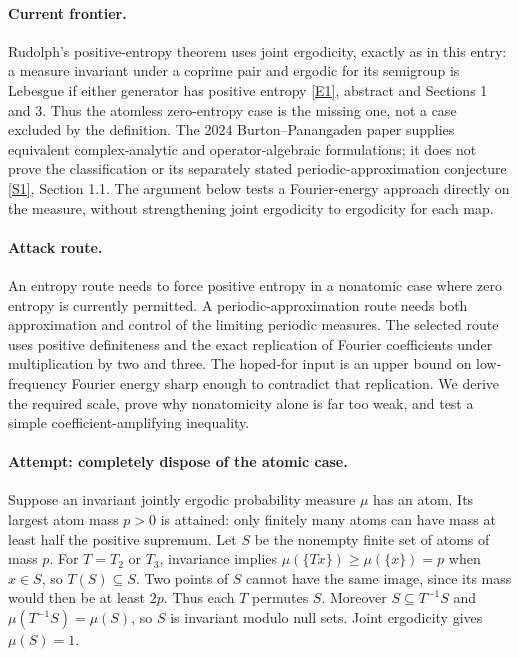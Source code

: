 \documentclass[11pt,a4paper]{article}
\newcommand{\sref}[2]{\hyperlink{source:#1:#2}{[S#2]}}
\newcommand{\eref}[2]{\hyperlink{extra:#1:#2}{[E#2]}}
\numberwithin{equation}{section}
\begin{document}
\paragraph{Current frontier.}
Rudolph's positive-entropy theorem uses joint ergodicity, exactly as in
this entry: a measure invariant under a coprime pair and ergodic for its
semigroup is Lebesgue if either generator has positive entropy
\eref{30006777}{1}, abstract and Sections 1 and 3. Thus the atomless zero-entropy
case is the missing one, not a case excluded by the definition. The 2024
Burton--Panangaden paper supplies equivalent complex-analytic and
operator-algebraic formulations; it does not prove the classification or
its separately stated periodic-approximation conjecture
\sref{30006777}{1}, Section 1.1. The argument below tests a Fourier-energy
approach directly on the measure, without strengthening joint ergodicity
to ergodicity for each map.

\paragraph{Attack route.}
An entropy route needs to force positive entropy in a nonatomic case where
zero entropy is currently permitted. A periodic-approximation route needs
both approximation and control of the limiting periodic measures. The
selected route uses positive definiteness and the exact replication of
Fourier coefficients under multiplication by two and three. The hoped-for
input is an upper bound on low-frequency Fourier energy sharp enough to
contradict that replication. We derive the required scale, prove why
nonatomicity alone is far too weak, and test a simple coefficient-amplifying
inequality.

\paragraph{Attempt: completely dispose of the atomic case.}
Suppose an invariant jointly ergodic probability measure $\mu$ has an atom.
Its largest atom mass $p>0$ is attained: only finitely many atoms can have
mass at least half the positive supremum. Let $S$ be the nonempty finite
set of atoms of mass $p$. For $T=T_2$ or $T_3$, invariance implies
$\mu(\{Tx\})\ge\mu(\{x\})=p$ when $x\in S$, so $T(S)\subseteq S$.
Two points of $S$ cannot have the same image, since its mass would then be
at least $2p$. Thus each $T$ permutes $S$. Moreover $S\subseteq T^{-1}S$
and $\mu(T^{-1}S)=\mu(S)$, so $S$ is invariant modulo null sets.
Joint ergodicity gives $\mu(S)=1$.
\end{document}
